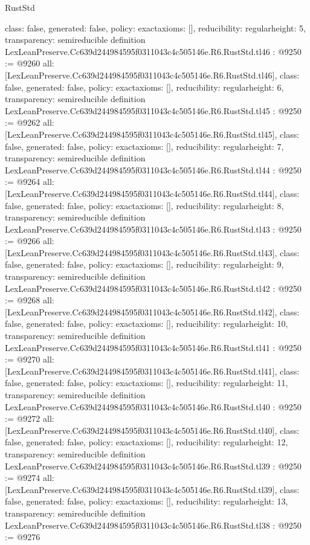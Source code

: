\begin{lexlean}{RustStd}
\begin{coremodule}
{  class: false,
  generated: false,
  policy: exact{axioms: []},
  reducibility: regular{height: 5},
  transparency: semireducible
}
definition LexLeanPreserve.Cc639d244984595f0311043c4c505146e.R6.RustStd.tl46 : @9250 := @9260 {
  all: [LexLeanPreserve.Cc639d244984595f0311043c4c505146e.R6.RustStd.tl46],
  class: false,
  generated: false,
  policy: exact{axioms: []},
  reducibility: regular{height: 6},
  transparency: semireducible
}
definition LexLeanPreserve.Cc639d244984595f0311043c4c505146e.R6.RustStd.tl45 : @9250 := @9262 {
  all: [LexLeanPreserve.Cc639d244984595f0311043c4c505146e.R6.RustStd.tl45],
  class: false,
  generated: false,
  policy: exact{axioms: []},
  reducibility: regular{height: 7},
  transparency: semireducible
}
definition LexLeanPreserve.Cc639d244984595f0311043c4c505146e.R6.RustStd.tl44 : @9250 := @9264 {
  all: [LexLeanPreserve.Cc639d244984595f0311043c4c505146e.R6.RustStd.tl44],
  class: false,
  generated: false,
  policy: exact{axioms: []},
  reducibility: regular{height: 8},
  transparency: semireducible
}
definition LexLeanPreserve.Cc639d244984595f0311043c4c505146e.R6.RustStd.tl43 : @9250 := @9266 {
  all: [LexLeanPreserve.Cc639d244984595f0311043c4c505146e.R6.RustStd.tl43],
  class: false,
  generated: false,
  policy: exact{axioms: []},
  reducibility: regular{height: 9},
  transparency: semireducible
}
definition LexLeanPreserve.Cc639d244984595f0311043c4c505146e.R6.RustStd.tl42 : @9250 := @9268 {
  all: [LexLeanPreserve.Cc639d244984595f0311043c4c505146e.R6.RustStd.tl42],
  class: false,
  generated: false,
  policy: exact{axioms: []},
  reducibility: regular{height: 10},
  transparency: semireducible
}
definition LexLeanPreserve.Cc639d244984595f0311043c4c505146e.R6.RustStd.tl41 : @9250 := @9270 {
  all: [LexLeanPreserve.Cc639d244984595f0311043c4c505146e.R6.RustStd.tl41],
  class: false,
  generated: false,
  policy: exact{axioms: []},
  reducibility: regular{height: 11},
  transparency: semireducible
}
definition LexLeanPreserve.Cc639d244984595f0311043c4c505146e.R6.RustStd.tl40 : @9250 := @9272 {
  all: [LexLeanPreserve.Cc639d244984595f0311043c4c505146e.R6.RustStd.tl40],
  class: false,
  generated: false,
  policy: exact{axioms: []},
  reducibility: regular{height: 12},
  transparency: semireducible
}
definition LexLeanPreserve.Cc639d244984595f0311043c4c505146e.R6.RustStd.tl39 : @9250 := @9274 {
  all: [LexLeanPreserve.Cc639d244984595f0311043c4c505146e.R6.RustStd.tl39],
  class: false,
  generated: false,
  policy: exact{axioms: []},
  reducibility: regular{height: 13},
  transparency: semireducible
}
definition LexLeanPreserve.Cc639d244984595f0311043c4c505146e.R6.RustStd.tl38 : @9250 := @9276 {
}
\end{coremodule}
\end{lexlean}
